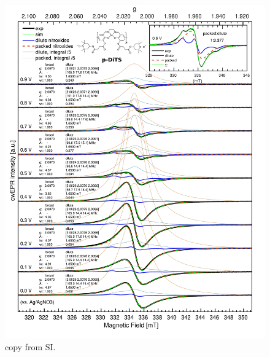\begin{figure}[h]
\center
	\includegraphics[width=1\textwidth]{./operando_epr/figures/CRYO/Figure_S7_new.pdf}
	\caption{copy from SI.}
	\label{fig:cwEPR_CRYO_DiTS_CHG_SIM}
\end{figure}



